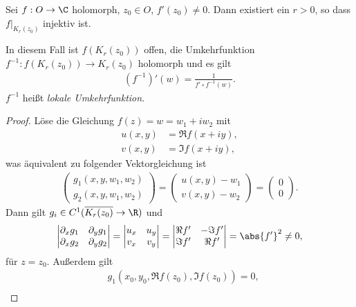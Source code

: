 \begin{prop}
\label{prop:2.54}
Sei $f:O\to\C$ holomorph, $z_0\in O$, $f'(z_0)\neq 0$. Dann existiert ein
$r>0$, so dass $f\big|_{K_r(z_0)}$ injektiv ist.

In diesem Fall ist $f(K_r(z_0))$ offen, die Umkehrfunktion $f^{-1}:
f(K_r(z_0))\to K_r(z_0)$ holomorph und es gilt
\begin{align*}
\left(f^{-1}\right)'(w) = \frac{1}{f'\circ f^{-1}(w)}.
\end{align*}
$f^{-1}$ heißt \emph{lokale Umkehrfunktion}.\fishhere
\end{prop}
\begin{proof}
Löse die Gleichung $f(z) = w = w_1+iw_2$ mit
\begin{align*}
u(x,y) &= \Re f(x+iy),\\
v(x,y) &= \Im f(x+iy),
\end{align*}
was äquivalent zu folgender Vektorgleichung ist
\begin{align*}
\begin{pmatrix}
g_1(x,y,w_1,w_2)\\
g_2(x,y,w_1,w_2)
\end{pmatrix}
= \begin{pmatrix}
  u(x,y)-w_1\\
  v(x,y)-w_2
  \end{pmatrix}
= \begin{pmatrix}
  0\\0
  \end{pmatrix}.
\end{align*}
Dann gilt $g_i\in C^1(\overline{K_r(z_0)}\to\R)$ und
\begin{align*}
\begin{vmatrix}
\partial_x g_1 & \partial_y g_1\\
\partial_x g_2 & \partial_y g_2\\
\end{vmatrix}
=
\begin{vmatrix}
u_x & u_y\\
v_x & v_y\\
\end{vmatrix}
= \begin{vmatrix}
\Re f' & -\Im f'\\
\Im f' & \Re f'\\
\end{vmatrix}
= \abs{f'}^2 \neq 0,
\end{align*}
für $z=z_0$. Außerdem gilt
\begin{align*}
&g_1(x_0,y_0,\Re f(z_0), \Im f(z_0)) = 0,\\

\end{align*}
\end{proof}

